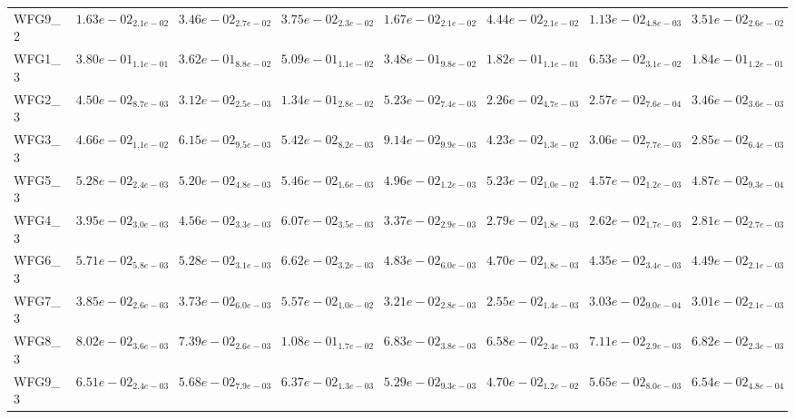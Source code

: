\documentclass{article}
\begin{document}
\begin{landscape}
\begin{table}
\begin{scriptsize}
\begin{tabular}{llllllll}
WFG9\_2 & \cellcolor{gray25}$  1.63e-02_{ 2.1e-02}$ & $  3.46e-02_{ 2.7e-02}$ & $  3.75e-02_{ 2.3e-02}$ & $  1.67e-02_{ 2.1e-02}$ & $  4.44e-02_{ 2.1e-02}$ & \cellcolor{gray95}$  1.13e-02_{ 4.8e-03}$ & $  3.51e-02_{ 2.6e-02}$ \\
WFG1\_3 & $  3.80e-01_{ 1.1e-01}$ & $  3.62e-01_{ 8.8e-02}$ & $  5.09e-01_{ 1.1e-02}$ & $  3.48e-01_{ 9.8e-02}$ & \cellcolor{gray25}$  1.82e-01_{ 1.1e-01}$ & \cellcolor{gray95}$  6.53e-02_{ 3.1e-02}$ & $  1.84e-01_{ 1.2e-01}$ \\
WFG2\_3 & $  4.50e-02_{ 8.7e-03}$ & $  3.12e-02_{ 2.5e-03}$ & $  1.34e-01_{ 2.8e-02}$ & $  5.23e-02_{ 7.4e-03}$ & \cellcolor{gray95}$  2.26e-02_{ 4.7e-03}$ & \cellcolor{gray25}$  2.57e-02_{ 7.6e-04}$ & $  3.46e-02_{ 3.6e-03}$ \\
WFG3\_3 & $  4.66e-02_{ 1.1e-02}$ & $  6.15e-02_{ 9.5e-03}$ & $  5.42e-02_{ 8.2e-03}$ & $  9.14e-02_{ 9.9e-03}$ & $  4.23e-02_{ 1.3e-02}$ & \cellcolor{gray25}$  3.06e-02_{ 7.7e-03}$ & \cellcolor{gray95}$  2.85e-02_{ 6.4e-03}$ \\
WFG5\_3 & $  5.28e-02_{ 2.4e-03}$ & $  5.20e-02_{ 4.8e-03}$ & $  5.46e-02_{ 1.6e-03}$ & $  4.96e-02_{ 1.2e-03}$ & $  5.23e-02_{ 1.0e-02}$ & \cellcolor{gray95}$  4.57e-02_{ 1.2e-03}$ & \cellcolor{gray25}$  4.87e-02_{ 9.3e-04}$ \\
WFG4\_3 & $  3.95e-02_{ 3.0e-03}$ & $  4.56e-02_{ 3.3e-03}$ & $  6.07e-02_{ 3.5e-03}$ & $  3.37e-02_{ 2.9e-03}$ & \cellcolor{gray25}$  2.79e-02_{ 1.8e-03}$ & \cellcolor{gray95}$  2.62e-02_{ 1.7e-03}$ & $  2.81e-02_{ 2.7e-03}$ \\
WFG6\_3 & $  5.71e-02_{ 5.8e-03}$ & $  5.28e-02_{ 3.1e-03}$ & $  6.62e-02_{ 3.2e-03}$ & $  4.83e-02_{ 6.0e-03}$ & $  4.70e-02_{ 1.8e-03}$ & \cellcolor{gray95}$  4.35e-02_{ 3.4e-03}$ & \cellcolor{gray25}$  4.49e-02_{ 2.1e-03}$ \\
WFG7\_3 & $  3.85e-02_{ 2.6e-03}$ & $  3.73e-02_{ 6.0e-03}$ & $  5.57e-02_{ 1.0e-02}$ & $  3.21e-02_{ 2.8e-03}$ & \cellcolor{gray95}$  2.55e-02_{ 1.4e-03}$ & $  3.03e-02_{ 9.0e-04}$ & \cellcolor{gray25}$  3.01e-02_{ 2.1e-03}$ \\
WFG8\_3 & $  8.02e-02_{ 3.6e-03}$ & $  7.39e-02_{ 2.6e-03}$ & $  1.08e-01_{ 1.7e-02}$ & $  6.83e-02_{ 3.8e-03}$ & \cellcolor{gray95}$  6.58e-02_{ 2.4e-03}$ & $  7.11e-02_{ 2.9e-03}$ & \cellcolor{gray25}$  6.82e-02_{ 2.3e-03}$ \\
WFG9\_3 & $  6.51e-02_{ 2.4e-03}$ & $  5.68e-02_{ 7.9e-03}$ & $  6.37e-02_{ 1.3e-03}$ & \cellcolor{gray25}$  5.29e-02_{ 9.3e-03}$ & \cellcolor{gray95}$  4.70e-02_{ 1.2e-02}$ & $  5.65e-02_{ 8.0e-03}$ & $  6.54e-02_{ 4.8e-04}$ \\

\end{tabular}
\end{scriptsize}
\end{table}
\end{landscape}
\end{document}
